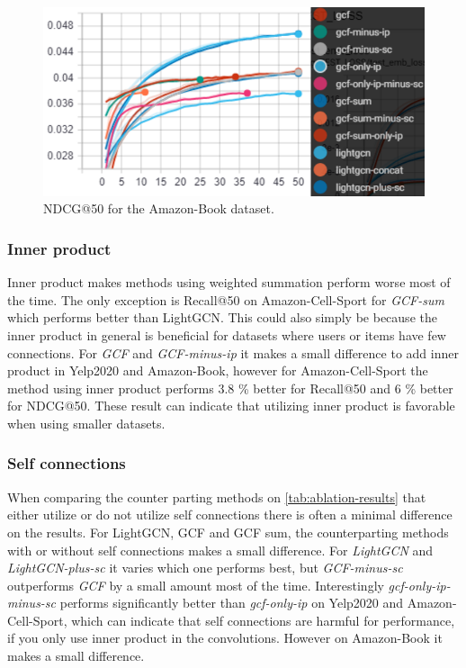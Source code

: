\begin{figure}[]
    \includegraphics[width=\linewidth]{figures/amazon-book-gcf-all-ndcg.png}
    \caption{NDCG@50 for the Amazon-Book dataset.}
    \label{fig:GCF-NDCG-ablation-study-amazon-book}
\end{figure}

\subsubsection{Inner product}
Inner product makes methods using weighted summation perform worse most of the time.
The only exception is Recall@50 on Amazon-Cell-Sport for \textit{GCF-sum} which performs better than LightGCN.
This could also simply be because the inner product in general is beneficial for datasets where users or items have few connections.
For \textit{GCF} and \textit{GCF-minus-ip} it makes a small difference to add inner product in Yelp2020 and Amazon-Book, however for Amazon-Cell-Sport the method using inner product performs 3.8 \% better for Recall@50 and 6 \% better for NDCG@50.
These result can indicate that utilizing inner product is favorable when using smaller datasets.

\subsubsection{Self connections}
When comparing the counter parting methods on \autoref{tab:ablation-results} that either utilize or do not utilize self connections there is often a minimal difference on the results.
For LightGCN, GCF and GCF sum, the counterparting methods with or without self connections makes a small difference.
For \textit{LightGCN} and \textit{LightGCN-plus-sc} it varies which one performs best, but \textit{GCF-minus-sc} outperforms \textit{GCF} by a small amount most of the time.
Interestingly \textit{gcf-only-ip-minus-sc} performs significantly better than \textit{gcf-only-ip} on Yelp2020 and Amazon-Cell-Sport, which can indicate that self connections are harmful for performance, if you only use inner product in the convolutions.
However on Amazon-Book it makes a small difference.

